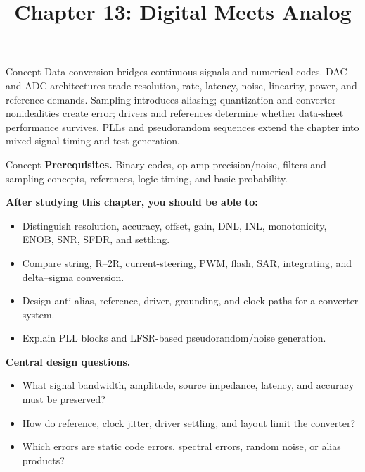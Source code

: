 \documentclass[10pt,letterpaper]{article}
\title{Chapter 13: Digital Meets Analog}
\author{}
\date{}
\begin{document}
\maketitle

\begin{CornellOverviewBox}{Concept}
Data conversion bridges continuous signals and numerical codes. DAC and ADC architectures trade resolution, rate, latency, noise, linearity, power, and reference demands. Sampling introduces aliasing; quantization and converter nonidealities create error; drivers and references determine whether data-sheet performance survives. PLLs and pseudorandom sequences extend the chapter into mixed-signal timing and test generation.
\end{CornellOverviewBox}
\begin{CornellOverviewBox}{Concept}
\textbf{Prerequisites.} Binary codes, op-amp precision/noise, filters and sampling concepts, references, logic timing, and basic probability.

\textbf{After studying this chapter, you should be able to:}
\begin{itemize}
  \item Distinguish resolution, accuracy, offset, gain, DNL, INL, monotonicity, ENOB, SNR, SFDR, and settling.
  \item Compare string, R--2R, current-steering, PWM, flash, SAR, integrating, and delta--sigma conversion.
  \item Design anti-alias, reference, driver, grounding, and clock paths for a converter system.
  \item Explain PLL blocks and LFSR-based pseudorandom/noise generation.
\end{itemize}\textbf{Central design questions.}
\begin{itemize}
  \item What signal bandwidth, amplitude, source impedance, latency, and accuracy must be preserved?
  \item How do reference, clock jitter, driver settling, and layout limit the converter?
  \item Which errors are static code errors, spectral errors, random noise, or alias products?
\end{itemize}\end{CornellOverviewBox}
\end{document}
